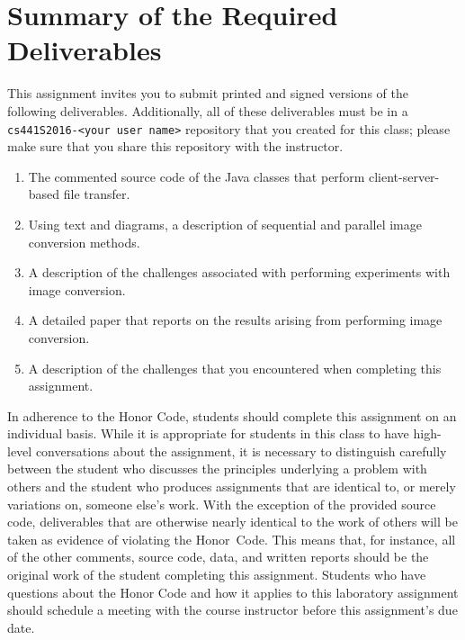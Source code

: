 \section*{Summary of the Required Deliverables}

This assignment invites you to submit printed and signed versions of the following deliverables. Additionally,
all of these deliverables must be in a {\tt cs441S2016-<your user name>} repository that you created for this class;
please make sure that you share this repository with the instructor.

\begin{enumerate}

    \item The commented source code of the Java classes that perform client-server-based file transfer.

    \item Using text and diagrams, a description of sequential and parallel image conversion methods.

    \item A description of the challenges associated with performing experiments with image conversion.

    \item A detailed paper that reports on the results arising from performing image conversion.

    \item A description of the challenges that you encountered when completing this assignment.

\end{enumerate}

In adherence to the Honor Code, students should complete this assignment on an individual basis. While it is appropriate
for students in this class to have high-level conversations about the assignment, it is necessary to distinguish
carefully between the student who discusses the principles underlying a problem with others and the student who produces
assignments that are identical to, or merely variations on, someone else's work.  With the exception of the provided
source code, deliverables that are otherwise nearly identical to the work of others will be taken as evidence of
violating the \mbox{Honor Code}. This means that, for instance, all of the other comments, source code, data, and
written reports should be the original work of the student completing this assignment. Students who have questions about
the Honor Code and how it applies to this laboratory assignment should schedule a meeting with the course instructor
before this assignment's due date.


